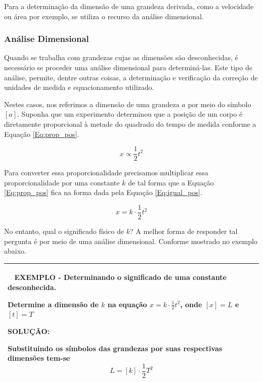\documentclass[a4paper, 11pt]{report}
\newenvironment{myboxed}
    {
        \begin{center}
        \begin{tabular}{p{0.7\textwidth}}
        \hline\
    }
    { 
        \\\hline
        \end{tabular} 
        \end{center}
    }
\begin{document}
Para a determinação da dimensão de uma grandeza derivada, como a velocidade ou 
área por exemplo, se utiliza o recurso da análise dimensional. 

\subsubsection{Análise Dimensional}
Quando se trabalha com grandezas cujas as dimensões são desconhecidas, é
necessário se proceder uma análise dimensional para determiná-las. Este tipo de 
análise, permite, dentre outras coisas, a determinação e verificação da correção
de unidades de medida e equacionamento utilizado. 

Nestes casos, nos referimos a dimensão de uma grandeza $a$ por meio do símbolo
$[a]$. Suponha que um experimento determinou que a posição de um corpo é 
diretamente proporcional à metade do quadrado do tempo de medida conforme a 
Equação \ref{Eq:prop_pos}.

\begin{equation}
    x \propto \frac{1}{2} t^2
    \label{Eq:prop_pos}
\end{equation}

Para converter essa proporcionalidade precisamos multiplicar essa 
proporcionalidade por uma constante $k$ de tal forma que a Equação 
\ref{Eq:prop_pos} fica na forma dada pela Equação \ref{Eq:igual_pos}.

\begin{equation}
    x = k \cdot \frac{1}{2} t^2
    \label{Eq:igual_pos}
\end{equation}

No entanto, qual o significado físico de $k$? A melhor forma de responder tal 
pergunta é por meio de uma análise dimensional. Conforme mostrado no exemplo 
abaixo. 

\begin{myboxed}
    \textbf{EXEMPLO - Determinando o significado de uma constante desconhecida.}

    Determine a dimensão de $k$ na equação $x = k \cdot \frac{1}{2} t^2$, 
    onde $[x] = L$ e $[t] = T$

    \textbf{SOLUÇÃO:}

    Substituindo os símbolos das grandezas por suas respectivas dimensões tem-se
    $$
        L = [k] \cdot \frac{1}{2} T^2
    $$
    
\end{myboxed}


\label{lastpage}
\end{document}
